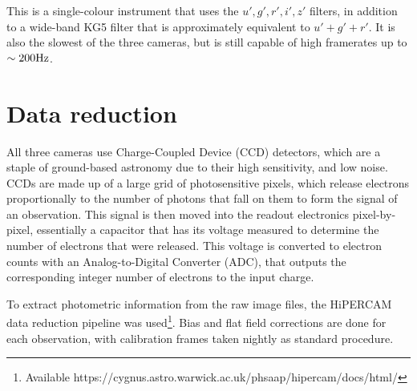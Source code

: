 This is a single-colour instrument that uses the $u',g',r',i',z'$ filters, in addition to a wide-band KG5 filter that is approximately equivalent to $u' + g' + r'$. It is also the slowest of the three cameras, but is still capable of high framerates up to $\sim 200 \rm Hz$.


\section{Data reduction}
\label{sect:data reduction}

All three cameras use Charge-Coupled Device (CCD) detectors, which are a staple of ground-based astronomy due to their high sensitivity, and low noise.
CCDs are made up of a large grid of photosensitive pixels, which release electrons proportionally to the number of photons that fall on them to form the signal of an observation. This signal is then moved into the readout electronics pixel-by-pixel, essentially a capacitor that has its voltage measured to determine the number of electrons that were released. This voltage is converted to electron counts with an Analog-to-Digital Converter (ADC), that outputs the corresponding integer number of electrons to the input charge.

To extract photometric information from the raw image files, the HiPERCAM data reduction pipeline was used\footnote{Available https://cygnus.astro.warwick.ac.uk/phsaap/hipercam/docs/html/}. 
Bias and flat field corrections are done for each observation, with calibration frames taken nightly as standard procedure.

